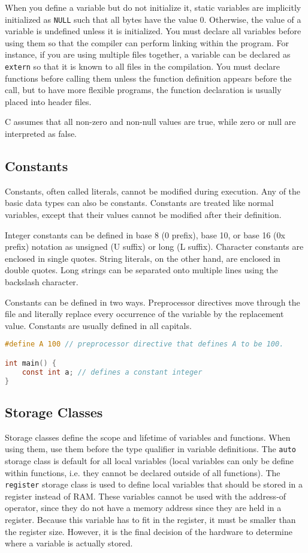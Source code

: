 \documentclass[10pt]{article}
\begin{document}
When you define a variable but do not initialize it, static variables are implicitly initialized as {\tt NULL} such that all bytes have the value 0. Otherwise, the value of a variable is undefined unless it is initialized. You must declare all variables before using them so that the compiler can perform linking within the program. For instance, if you are using multiple files together, a variable can be declared as {\tt extern} so that it is known to all files in the compilation. You must declare functions before calling them unless the function definition appears before the call, but to have more flexible programs, the function declaration is usually placed into header files. 

C assumes that all non-zero and non-null values are true, while zero or null are interpreted as false.

\subsection{Constants}
Constants, often called literals, cannot be modified during execution. Any of the basic data types can also be constants. Constants are treated like normal variables, except that their values cannot be modified after their definition. 

Integer constants can be defined in base 8 (0 prefix), base 10, or base 16 (0x prefix) notation as unsigned (U suffix) or long (L suffix). Character constants are enclosed in single quotes. String literals, on the other hand, are enclosed in double quotes. Long strings can be separated onto multiple lines using the backslash character. 

Constants can be defined in two ways. Preprocessor directives move through the file and literally replace every occurrence of the variable by the replacement value. Constants are usually defined in all capitals. 

\begin{lstlisting}[language=C]
#define A 100 // preprocessor directive that defines A to be 100.

int main() {
	const int a; // defines a constant integer
}
\end{lstlisting}


\subsection{Storage Classes}
Storage classes define the scope and lifetime of variables and functions. When using them, use them before the type qualifier in variable definitions. The {\tt auto} storage class is default for all local variables (local variables can only be define within functions, i.e. they cannot be declared outside of all functions). The {\tt register} storage class is used to define local variables that should be stored in a register instead of RAM. These variables cannot be used with the address-of operator, since they do not have a memory address since they are held in a register. Because this variable has to fit in the register, it must be smaller than the register size. However, it is the final decision of the hardware to determine where a variable is actually stored. 
\end{document}
